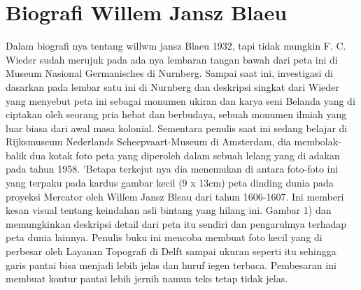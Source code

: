 

\section{Biografi Willem Jansz Blaeu}
Dalam biografi nya tentang willwm jansz Blaeu 1932, tapi tidak mungkin F. C. Wieder sudah merujuk pada ada nya lembaran tangan bawah 
dari peta ini di Museum Nasional Germanisches di Nurnberg. Sampai saat ini, investigasi di dasarkan pada lembar satu ini di Nurnberg 
dan deskripsi singkat dari Wieder yang menyebut peta ini sebagai monumen ukiran dan karya seni Belanda yang di ciptakan oleh seorang 
pria hebat dan berbudaya, sebuah monumen ilmiah yang luar biasa dari awal masa kolonial. Sementara penulis saat ini sedang belajar 
di Rijksmuseum Nederlands Scheepvaart-Museum di Amsterdam, dia membolak-balik dua kotak foto peta yang diperoleh dalam sebuah lelang yang di adakan pada tahun 1958. 
'Betapa terkejut nya dia menemukan di antara foto-foto ini yang terpaku pada kardus gambar kecil (9 x 13cm) peta dinding dunia 
pada proyeksi Mercator oleh Willem Jansz Bleau dari tahun 1606-1607. Ini memberi kesan visual tentang keindahan asli bintang yang hilang ini. 
Gambar 1) dan memungkinkan deskripsi detail dari peta itu sendiri dan pengaruhnya terhadap peta dunia lainnya. 
Penulis buku ini mencoba membuat foto kecil yang di perbesar oleh Layanan Topografi di Delft sampai ukuran seperti itu 
sehingga garis pantai bisa menjadi lebih jelas dan huruf iegen terbaca. Pembesaran ini membuat kontur pantai lebih jernih namun teks tetap tidak jelas. 




